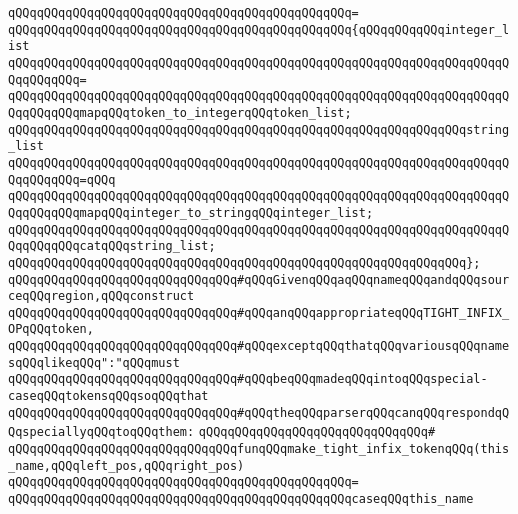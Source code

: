 \verb|qQQqqQQqqQQqqQQqqQQqqQQqqQQqqQQqqQQqqQQqqQQqqQQq=|\newline
\verb|qQQqqQQqqQQqqQQqqQQqqQQqqQQqqQQqqQQqqQQqqQQqqQQq{qQQqqQQqqQQqinteger_list|\newline
\verb|qQQqqQQqqQQqqQQqqQQqqQQqqQQqqQQqqQQqqQQqqQQqqQQqqQQqqQQqqQQqqQQqqQQqqQQqqQQqqQQq=|\newline
\verb|qQQqqQQqqQQqqQQqqQQqqQQqqQQqqQQqqQQqqQQqqQQqqQQqqQQqqQQqqQQqqQQqqQQqqQQqqQQqqQQqmapqQQqtoken_to_integerqQQqtoken_list;|\newline
\newline
\verb|qQQqqQQqqQQqqQQqqQQqqQQqqQQqqQQqqQQqqQQqqQQqqQQqqQQqqQQqqQQqqQQqstring_list|\newline
\verb|qQQqqQQqqQQqqQQqqQQqqQQqqQQqqQQqqQQqqQQqqQQqqQQqqQQqqQQqqQQqqQQqqQQqqQQqqQQqqQQq=qQQq|\newline
\verb|qQQqqQQqqQQqqQQqqQQqqQQqqQQqqQQqqQQqqQQqqQQqqQQqqQQqqQQqqQQqqQQqqQQqqQQqqQQqqQQqmapqQQqinteger_to_stringqQQqinteger_list;|\newline
\newline
\verb|qQQqqQQqqQQqqQQqqQQqqQQqqQQqqQQqqQQqqQQqqQQqqQQqqQQqqQQqqQQqqQQqqQQqqQQqqQQqqQQqcatqQQqstring_list;|\newline
\verb|qQQqqQQqqQQqqQQqqQQqqQQqqQQqqQQqqQQqqQQqqQQqqQQqqQQqqQQqqQQqqQQq};|\newline
\newline
\newline
\verb|qQQqqQQqqQQqqQQqqQQqqQQqqQQqqQQq#qQQqGivenqQQqaqQQqnameqQQqandqQQqsourceqQQqregion,qQQqconstruct|\newline
\verb|qQQqqQQqqQQqqQQqqQQqqQQqqQQqqQQq#qQQqanqQQqappropriateqQQqTIGHT_INFIX_OPqQQqtoken,|\newline
\verb|qQQqqQQqqQQqqQQqqQQqqQQqqQQqqQQq#qQQqexceptqQQqthatqQQqvariousqQQqnamesqQQqlikeqQQq":"qQQqmust|\newline
\verb|qQQqqQQqqQQqqQQqqQQqqQQqqQQqqQQq#qQQqbeqQQqmadeqQQqintoqQQqspecial-caseqQQqtokensqQQqsoqQQqthat|\newline
\verb|qQQqqQQqqQQqqQQqqQQqqQQqqQQqqQQq#qQQqtheqQQqparserqQQqcanqQQqrespondqQQqspeciallyqQQqtoqQQqthem:|\newline
\verb|qQQqqQQqqQQqqQQqqQQqqQQqqQQqqQQq#|\newline
\verb|qQQqqQQqqQQqqQQqqQQqqQQqqQQqqQQqfunqQQqmake_tight_infix_tokenqQQq(this_name,qQQqleft_pos,qQQqright_pos)|\newline
\verb|qQQqqQQqqQQqqQQqqQQqqQQqqQQqqQQqqQQqqQQqqQQqqQQq=|\newline
\verb|qQQqqQQqqQQqqQQqqQQqqQQqqQQqqQQqqQQqqQQqqQQqqQQqcaseqQQqthis_name|\newline
